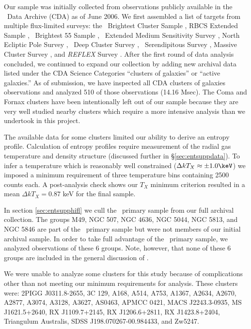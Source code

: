 Our sample was initially collected from observations publicly
available in the \chandra\ Data Archive (CDA) as of June 2006. We
first assembled a list of targets from multiple flux-limited surveys:
the \rosat\ Brightest Cluster Sample \citep{1998MNRAS.301..881E}, RBCS
Extended Sample \citep{2000MNRAS.318..333E}, \rosat\ Brightest 55
Sample \citep{1990MNRAS.245..559E, 1998MNRAS.298..416P},
\einstein\ Extended Medium Sensitivity Survey
\citep{1990ApJS...72..567G}, North Ecliptic Pole Survey
\citep{2006ApJS..162..304H}, \rosat\ Deep Cluster Survey
\citep{1995ApJ...445L..11R}, \rosat\ Serendipitous Survey
\citep{1998ApJ...502..558V}, Massive Cluster Survey
\citep{2001ApJ...553..668E}, and {\it{REFLEX}} Survey
\citep{reflex}. After the first round of data analysis concluded, we
continued to expand our collection by adding new archival data listed
under the CDA Science Categories ``clusters of galaxies'' or ``active
galaxies.'' As of submission, we have inspected all CDA clusters of
galaxies observations and analyzed 510 of those observations (14.16
Msec). The Coma and Fornax clusters have been intentionally left out
of our sample because they are very well studied nearby clusters which
require a more intensive analysis than we undertook in this project.

The available data for some clusters limited our ability to derive an
entropy profile. Calculation of entropy profiles require measurement
of the radial gas temperature and density structure (discussed further
in \S\ref{sec:entsuppdata}). To infer a temperature which is reasonably well
constrained ($\Delta kT_X \approx \pm 1.0 \keV$) we imposed a minimum
requirement of three temperature bins containing 2500 counts each. A
post-analysis check shows our $T_X$ minimum criterion resulted in a
mean $\Delta kT_X = 0.87$ keV for the final sample.

In section \ref{sec:entsupphifl} we cull the \hifl\ primary sample
\citep{hiflugcs1, hiflugcs2} from our full archival collection. The
groups M49, NGC 507, NGC 4636, NGC 5044, NGC 5813, and NGC 5846 are
part of the \hifl\ primary sample but were not members of our initial
archival sample. In order to take full advantage of the \hifl\ primary
sample, we analyzed observations of these 6 groups. Note, however,
that none of these 6 groups are included in the general discussion of
\accept.

We were unable to analyze some clusters for this study because of
complications other than not meeting our minimum requirements for
analysis. These clusters were: 2PIGG J0311.8-2655, 3C 129, A168, A514,
A753, A1367, A2634, A2670, A2877, A3074, A3128, A3627, AS0463, APMCC
0421, MACS J2243.3-0935, MS J1621.5+2640, RX J1109.7+2145, RX
J1206.6+2811, RX J1423.8+2404, Triangulum Australis, SDSS
J198.070267-00.984433, and Zw5247.

